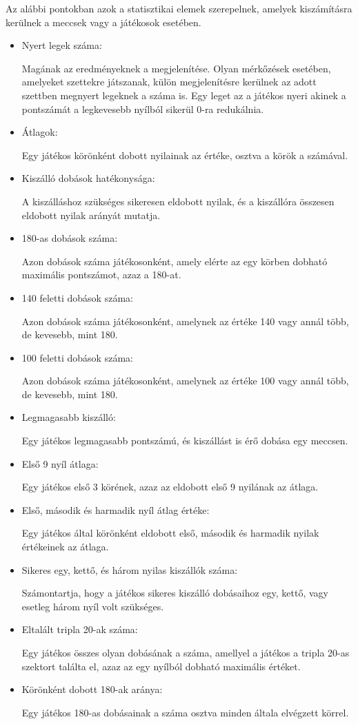 Az alábbi pontokban azok a statisztikai elemek szerepelnek, amelyek kiszámításra kerülnek a meccsek vagy a játékosok esetében.

\begin{itemize}
\item Nyert legek száma:

Magának az eredményeknek a megjelenítése. Olyan mérkőzések esetében, amelyeket szettekre játszanak, külön megjelenítésre kerülnek az adott szettben megnyert legeknek a száma is. Egy leget az a játékos nyeri akinek a pontszámát a legkevesebb nyílból sikerül 0-ra redukálnia.
\item Átlagok:

Egy játékos körönként dobott nyilainak az értéke, osztva a körök a számával.
\item Kiszálló dobások hatékonysága:

A kiszálláshoz szükséges sikeresen eldobott nyilak, és a kiszállóra összesen eldobott nyilak arányát mutatja.
\item 180-as dobások száma:

Azon dobások száma játékosonként, amely elérte az egy körben dobható maximális pontszámot, azaz a 180-at.
\item 140 feletti dobások száma:

Azon dobások száma játékosonként, amelynek az értéke 140 vagy annál több, de kevesebb, mint 180.
\item 100 feletti dobások száma:

Azon dobások száma játékosonként, amelynek az értéke 100 vagy annál több, de kevesebb, mint 180.
\item Legmagasabb kiszálló:

Egy játékos legmagasabb pontszámú, és kiszállást is érő dobása egy meccsen.
\item Első 9 nyíl átlaga:

Egy játékos első 3 körének, azaz az eldobott első 9 nyilának az átlaga.
\item Első, második és harmadik nyíl átlag értéke:

Egy játékos által körönként eldobott első, második és harmadik nyilak értékeinek az átlaga.
\item Sikeres egy, kettő, és három nyilas kiszállók száma:

Számontartja, hogy a játékos sikeres kiszálló dobásaihoz egy, kettő, vagy esetleg három nyíl volt szükséges.
\item Eltalált tripla 20-ak száma:

Egy játékos összes olyan dobásának a száma, amellyel a játékos a tripla 20-as szektort találta el, azaz az egy nyílból dobható maximális értéket.

\item Körönként dobott 180-ak aránya:

Egy játékos 180-as dobásainak a száma osztva minden általa elvégzett körrel.

\end{itemize}

